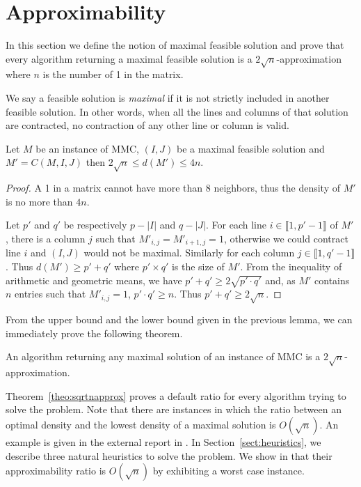 \section{Approximability}
\label{sect:approx}

In this section we define the notion of maximal feasible solution and prove that every algorithm returning a maximal feasible solution is a $2\sqrt{n}$-approximation where $n$ is the number of 1 in the matrix.

\begin{definition}
We say a feasible solution is \emph{maximal} if it is not strictly included in another feasible solution. In other words, when all the lines and columns of that solution are contracted, no contraction of any other line or column is valid.
\end{definition}

\begin{lemma}
\label{lem:bounds}
Let $M$ be an instance of MMC, $(I,J)$ be a maximal feasible solution and $M' = C(M,I,J)$ then $2 \sqrt{n} \leq d(M') \leq 4n$.
\end{lemma}
\begin{proof}
A 1 in a matrix cannot have more than $8$ neighbors, thus the density of $M'$ is no more than $4n$.

Let $p'$ and $q'$ be respectively $p - |I|$ and $q - |J|$. For each line $i \in \llbracket 1,p'-1 \rrbracket$ of $M'$, there is a column $j$ such that $M'_{i,j} = M'_{i+1,j} = 1$, otherwise we could contract line $i$ and $(I,J)$ would not be maximal. Similarly for each column $j \in \llbracket 1,q'-1 \rrbracket$. Thus $d(M') \geq p'+q'$ where $p' \times q'$ is the size of $M'$. From the inequality of arithmetic and geometric means, we have $p' + q ' \geq 2 \sqrt{p'\cdot q'}$ and, as $M'$ contains $n$ entries such that $M'_{i,j} = 1$, $p'\cdot q' \geq n$. Thus $p' + q ' \geq 2 \sqrt{n}$.
\end{proof}

From the upper bound and the lower bound given in the previous lemma, we can immediately prove the following theorem. 

\begin{theorem}
	\label{theo:sqrtnapprox}
An algorithm returning any maximal solution of an instance of MMC is a $2\sqrt{n}$-approximation.
\end{theorem}

Theorem~\ref{theo:sqrtnapprox} proves a default ratio for every algorithm trying to solve the problem. Note that there are instances in which the ratio between an optimal density and the lowest density of a maximal solution is $O(\sqrt{n})$. An example is given in the external report in \cite{WatelPoirionAppendix}. In Section~\ref{sect:heuristics}, we describe three natural heuristics to solve the problem. We show  in \cite{WatelPoirionAppendix} that their approximability ratio is $O(\sqrt{n})$ by exhibiting a worst case instance. 

